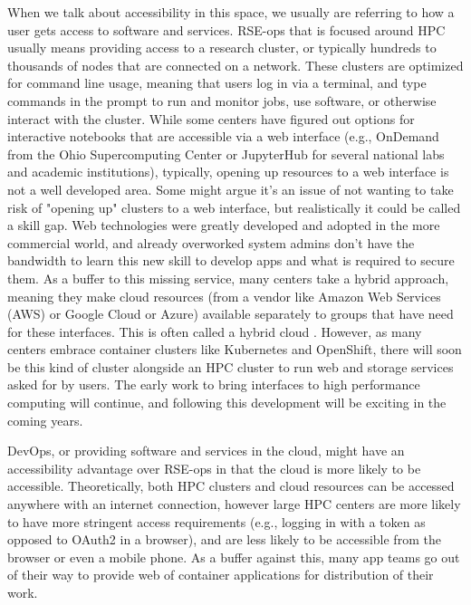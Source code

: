 When we talk about accessibility in this space, we usually are referring to how a user gets access to software and services. RSE-ops that is focused around HPC usually means providing access to a research cluster, or typically hundreds to thousands of nodes that are connected on a network. These clusters are optimized for command line usage, meaning that users log in via a terminal, and type commands in the prompt to run and monitor jobs, use software, or otherwise interact with the cluster. While some centers have figured out options for interactive notebooks that are accessible via a web interface (e.g., OnDemand from the Ohio Supercomputing Center \cite{ondemand} or JupyterHub \cite{juypterhub} for several national labs and academic institutions), typically, opening up resources to a web interface is not a well developed area. Some might argue it's an issue of not wanting to take risk of "opening up" clusters to a web interface, but realistically it could be called a skill gap.  Web technologies were greatly developed and adopted in the more commercial world, and already overworked system admins don't have the bandwidth to learn this new skill to develop apps and what is required to secure them. As a buffer to this missing service, many centers take a hybrid approach, meaning they make cloud resources (from a vendor like Amazon Web Services (AWS) or Google Cloud or Azure) available separately to groups that have need for these interfaces. This is often called a hybrid cloud \cite{hybrid-cloud}. However, as many centers embrace container clusters like Kubernetes and OpenShift, there will soon be this kind of cluster alongside an HPC cluster to run web and storage services asked for by users. The early work to bring interfaces to high performance computing \cite{web-interfaces} will continue, and following this development will be exciting in the coming years.

DevOps, or providing software and services in the cloud, might have an accessibility advantage over RSE-ops in that the cloud is more likely to be accessible. Theoretically, both HPC clusters and cloud resources can be accessed anywhere with an internet connection, however large HPC centers are more likely to have more stringent access requirements (e.g., logging in with a token as opposed to OAuth2 in a browser), and are less likely to be accessible from the browser or even a mobile phone. As a buffer against this, many app teams go out of their way to provide web of container applications for distribution of their work.
